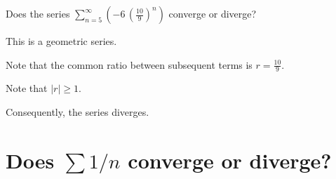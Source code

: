 \documentclass{ximera}
\begin{document}
\begin{question}
\begin{solution}
\begin{hint}
    \end{hint}
    
    
    \begin{multiple-choice}
      
    \end{multiple-choice}
    
  \end{solution}
\end{question}

\begin{question}
  Does the series \(\displaystyle\sum_{n=5}^\infty \left( -6 \, \left(\displaystyle\frac{10}{9}\right)^{n} \right)\) converge or diverge?

  \begin{solution}
    \begin{hint}
      This is a geometric series.
    \end{hint}
    \begin{hint}
      Note that the common ratio between subsequent terms is \(r = \displaystyle\frac{10}{9}\).
    \end{hint}
    \begin{hint}
      Note that \(|r| \geq 1\).
    \end{hint}
    \begin{hint}
      Consequently, the series diverges.
      
    \end{hint}
    

    \begin{multiple-choice}
    \end{multiple-choice}

  \end{solution}
\end{question}

\section{Does $\sum 1/n$ converge or diverge?}

\end{document}
